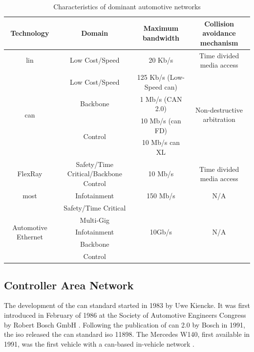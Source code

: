 \begin{table}
    \scriptsize
    \centering
    \begin{tabular}{*{4}{c}}
    \toprule
    \textbf{Technology} & \textbf{Domain} & \textbf{Maximum bandwidth} & \textbf{Collision avoidance mechanism}\\
    \midrule
    \acrshort{lin} & Low Cost/Speed & 20 Kb/s & Time divided media access\\
    \midrule
    \multirow{4}{*}{\gls{can}} & Low Cost/Speed & 125 Kb/s (Low-Speed \gls{can}) & \multirow{4}{*}{Non-destructive arbitration}\\
    & Backbone & 1 Mb/s (CAN 2.0) &\\
    & \multirow{2}{*}{Control} & 10 Mb/s (\gls{can} FD) &\\
    & & 10 Mb/s \gls{can} XL &\\
    \midrule
    FlexRay & Safety/Time Critical/Backbone Control & 10 Mb/s & Time divided media access\\
    \midrule
    \acrshort{most} & Infotainment & 150 Mb/s & N/A\\
    \midrule
    \multirow{5}{*}{Automotive Ethernet} & Safety/Time Critical & \multirow{5}{*}{10Gb/s} & \multirow{5}{*}{N/A}\\
    & Multi-Gig & &\\
    & Infotainment & &\\
    & Backbone & &\\
    & Control & &\\
    \bottomrule
    \end{tabular}
    \caption{Characteristics of dominant automotive networks}
    \label{fig:auto_networks}
\end{table}

\subsection{Controller Area Network}
\label{subsec:can}

The development of the \gls{can} standard started in 1983 by Uwe Kiencke. It was first introduced in February of 1986 at the Society of Automotive Engineers Congress by Robert Bosch GmbH \citep{can}. Following the publication of \gls{can} 2.0 by Bosch in 1991, the \gls{iso} released the \gls{can} standard \gls{iso} 11898. The Mercedes W140, first available in 1991, was the first vehicle with a \gls{can}-based in-vehicle network \citep{CAN_Merc}.\par

